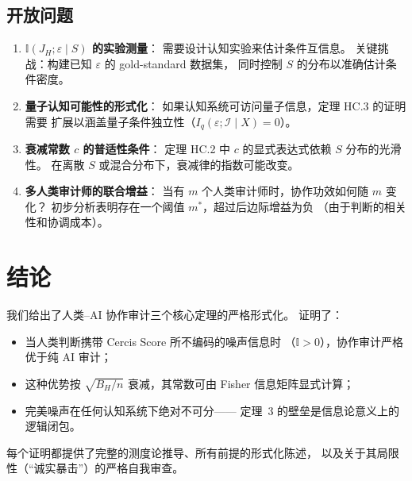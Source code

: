 \documentclass[12pt,a4paper]{article}
\newcommand{\I}{\mathbb{I}}
\newcommand{\cI}{\mathcal{I}}
\begin{document}
\subsection{开放问题}

\begin{enumerate}
    \item \textbf{$\I(J_H; \varepsilon \mid S)$ 的实验测量}：
          需要设计认知实验来估计条件互信息。
          关键挑战：构建已知 $\varepsilon$ 的 gold-standard 数据集，
          同时控制 $S$ 的分布以准确估计条件密度。
    \item \textbf{量子认知可能性的形式化}：
          如果认知系统可访问量子信息，定理 HC.3 的证明需要
          扩展以涵盖量子条件独立性（$I_q(\varepsilon; \cI \mid X) = 0$）。
    \item \textbf{衰减常数 $c$ 的普适性条件}：
          定理 HC.2 中 $c$ 的显式表达式依赖 $S$ 分布的光滑性。
          在离散 $S$ 或混合分布下，衰减律的指数可能改变。
    \item \textbf{多人类审计师的联合增益}：
          当有 $m$ 个人类审计师时，协作功效如何随 $m$ 变化？
          初步分析表明存在一个阈值 $m^*$，超过后边际增益为负
          （由于判断的相关性和协调成本）。
\end{enumerate}

\section{结论}

我们给出了人类--AI 协作审计三个核心定理的严格形式化。
证明了：
\begin{itemize}
    \item 当人类判断携带 Cercis Score 所不编码的噪声信息时
          （$\I > 0$），协作审计严格优于纯 AI 审计；
    \item 这种优势按 $\sqrt{B_H/n}$ 衰减，其常数可由
          Fisher 信息矩阵显式计算；
    \item 完美噪声在任何认知系统下绝对不可分——
          定理~3 的壁垒是信息论意义上的逻辑闭包。
\end{itemize}

每个证明都提供了完整的测度论推导、所有前提的形式化陈述，
以及关于其局限性（``诚实暴击''）的严格自我审查。

\appendix
\end{document}
